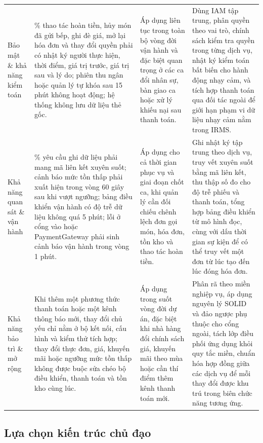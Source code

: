 \begin{longtable}{
  >{\bfseries\raggedright\arraybackslash}p{2.8cm}
  >{\raggedright\arraybackslash}p{4.4cm}
  >{\raggedright\arraybackslash}p{3.0cm}
  >{\raggedright\arraybackslash}p{4.2cm}
}
Bảo mật \& khả năng kiểm toán & 100\% thao tác hoàn tiền, hủy món đã gửi bếp, ghi đè giá, mở lại hóa đơn và thay đổi quyền phải có nhật ký người thực hiện, thời điểm, giá trị trước, giá trị sau và lý do; phiên thu ngân hoặc quản lý tự khóa sau 15 phút không hoạt động; hệ thống không lưu dữ liệu thẻ gốc. & Áp dụng liên tục trong toàn bộ vòng đời vận hành và đặc biệt quan trọng ở các ca đổi nhân sự, bàn giao ca hoặc xử lý khiếu nại sau thanh toán. & Dùng \textsf{IAM} tập trung, phân quyền theo vai trò, chính sách kiểm tra quyền trong từng dịch vụ, nhật ký kiểm toán bất biến cho hành động nhạy cảm, và tích hợp thanh toán qua đối tác ngoài để giới hạn phạm vi dữ liệu nhạy cảm nằm trong IRMS. \\
Khả năng quan sát \& vận hành & 100\% yêu cầu ghi dữ liệu phải mang mã liên kết xuyên suốt; cảnh báo mức tồn thấp phải xuất hiện trong vòng 60 giây sau khi vượt ngưỡng; bảng điều khiển vận hành có độ trễ dữ liệu không quá 5 phút; lỗi ở cổng vào hoặc \textsf{PaymentGateway} phải sinh cảnh báo vận hành trong vòng 1 phút. & Áp dụng cho cả thời gian phục vụ và giai đoạn chốt ca, khi quản lý cần đối chiếu chênh lệch đơn gọi món, hóa đơn, tồn kho và thao tác hoàn tiền. & Ghi nhật ký tập trung theo dịch vụ, truy vết xuyên suốt bằng mã liên kết, thu thập số đo cho độ trễ phiếu và thanh toán, tổng hợp bảng điều khiển từ mô hình đọc, cùng với dấu thời gian sự kiện để có thể truy vết một đơn từ lúc tạo đến lúc đóng hóa đơn. \\
Khả năng bảo trì \& mở rộng & Khi thêm một phương thức thanh toán hoặc một kênh thông báo mới, thay đổi chủ yếu chỉ nằm ở bộ kết nối, cấu hình và kiểm thử tích hợp; thay đổi thực đơn, giá, khuyến mãi hoặc ngưỡng mức tồn thấp không được buộc sửa chéo bộ điều khiển, thanh toán và tồn kho cùng lúc. & Áp dụng trong suốt vòng đời dự án, đặc biệt khi nhà hàng đổi chính sách giá, khuyến mãi theo mùa hoặc cần thí điểm thêm kênh thanh toán mới. & Phân rã theo miền nghiệp vụ, áp dụng nguyên lý SOLID và đảo ngược phụ thuộc cho cổng ngoài, tách lớp điều phối ứng dụng khỏi quy tắc miền, chuẩn hóa hợp đồng giữa các dịch vụ để mỗi thay đổi được khu trú trong biên chức năng tương ứng. \\
\bottomrule
\end{longtable}
\normalsize

\subsection{Lựa chọn kiến trúc chủ đạo}\label{sec:system-architecture-choice}

